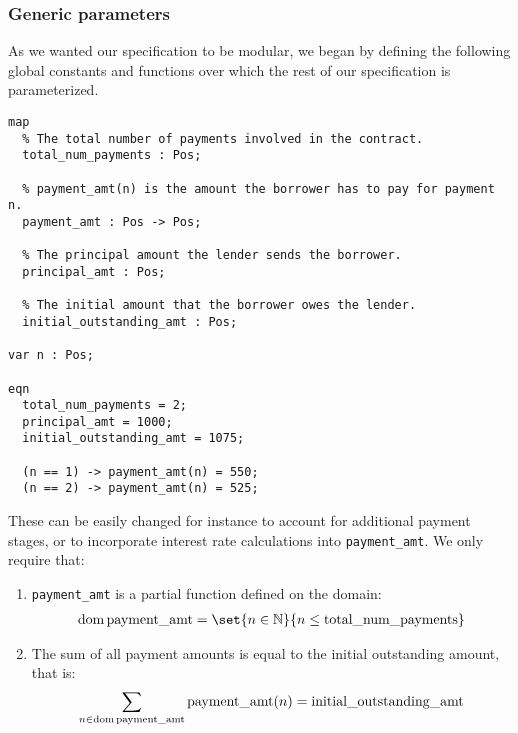 \documentclass{article}
\begin{document}
\subsubsection{Generic parameters}

As we wanted our specification to be modular, we began by defining the
following global constants and functions over which the rest of our
specification is parameterized.

\begin{verbatim}
map
  % The total number of payments involved in the contract.
  total_num_payments : Pos;

  % payment_amt(n) is the amount the borrower has to pay for payment n.
  payment_amt : Pos -> Pos;

  % The principal amount the lender sends the borrower.
  principal_amt : Pos;

  % The initial amount that the borrower owes the lender.
  initial_outstanding_amt : Pos;

var n : Pos;

eqn
  total_num_payments = 2;
  principal_amt = 1000;
  initial_outstanding_amt = 1075;

  (n == 1) -> payment_amt(n) = 550;
  (n == 2) -> payment_amt(n) = 525;
\end{verbatim}

These can be easily changed for instance to
account for additional payment stages, or to incorporate interest rate
calculations into \texttt{payment\_amt}.
We only require that:

\begin{enumerate}
  \item
  \texttt{payment\_amt} is a partial function defined on the domain:
  \begin{align*}
    \dom \text{payment\_amt} = \set{n \in \N}{n \leq \text{total\_num\_payments}}
  \end{align*}

  \item
  The sum of all payment amounts is equal to the initial outstanding amount,
  that is:
  \begin{align*}
    \sum_{n \in \operatorname{dom} \text{payment\_amt}}
      \text{payment\_amt}(n) = \text{initial\_outstanding\_amt}
  \end{align*}
\end{enumerate}
\end{document}
